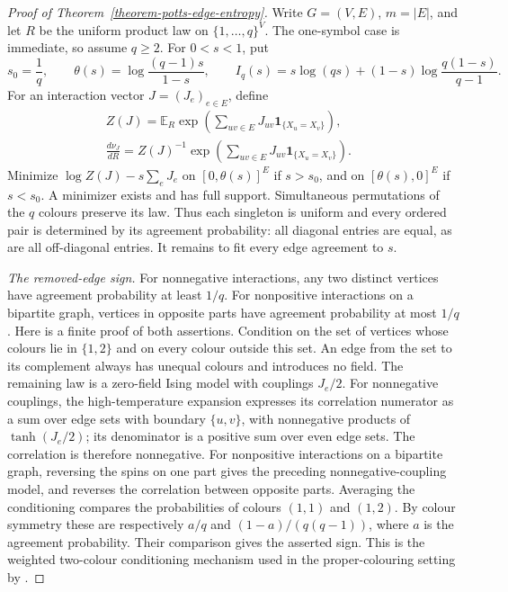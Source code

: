 \documentclass[a4paper,11pt,reqno]{amsart}
\theoremstyle{plain}
\theoremstyle{definition}
\theoremstyle{remark}
\begin{document}
\begin{proof}[Proof of Theorem~\ref{theorem-potts-edge-entropy}]
Write $G=(V,E)$, $m=|E|$, and let $R$ be the uniform product law on
$\{1,\ldots,q\}^{V}$.  The one-symbol case is immediate, so assume $q\ge2$.
For $0<s<1$, put
\[
 s_0=\frac1q,\qquad
 \theta(s)=\log\frac{(q-1)s}{1-s},\qquad
 I_q(s)=s\log(qs)+(1-s)\log\frac{q(1-s)}{q-1}.
\]
For an interaction vector $J=(J_e)_{e\in E}$, define
\begin{align*}
 Z(J)=\mathbb E_R\exp\!\left(\sum_{uv\in E}J_{uv}
                    \mathbf1_{\{X_u=X_v\}}\right),&\\
 \frac{d\nu_J}{dR}=Z(J)^{-1}
       \exp\!\left(\sum_{uv\in E}J_{uv}\mathbf1_{\{X_u=X_v\}}\right).&
\end{align*}
Minimize $\log Z(J)-s\sum_eJ_e$ on $[0,\theta(s)]^E$ if $s>s_0$,
and on $[\theta(s),0]^E$ if $s<s_0$.  A minimizer exists and has full
support.  Simultaneous permutations of the $q$ colours preserve its law.
Thus each singleton is uniform and every ordered pair is determined by its
agreement probability: all diagonal entries are equal, as are all
off-diagonal entries.  It remains to fit every edge agreement to $s$.

\smallskip\noindent\emph{The removed-edge sign.}
For nonnegative interactions, any two distinct vertices have agreement
probability at least $1/q$.  For nonpositive interactions on a bipartite
graph, vertices in opposite parts have agreement probability at most $1/q$.
Here is a finite proof of both assertions.  Condition on the set of vertices
whose colours lie in $\{1,2\}$ and on every colour outside this set.  An edge
from the set to its complement always has unequal colours and introduces no
field.  The remaining law is a zero-field Ising model with couplings $J_e/2$.
For nonnegative couplings, the high-temperature expansion expresses its
correlation numerator as a sum over edge sets with boundary $\{u,v\}$,
with nonnegative products of $\tanh(J_e/2)$; its denominator is a positive
sum over even edge sets.  The correlation is therefore nonnegative.
For nonpositive interactions on a bipartite graph, reversing the spins on
one part gives the preceding nonnegative-coupling model, and reverses the
correlation between opposite parts.  Averaging the conditioning compares
the probabilities of colours $(1,1)$ and $(1,2)$.  By colour symmetry these
are respectively $a/q$ and $(1-a)/(q(q-1))$, where $a$ is the agreement
probability.  Their comparison gives the asserted sign.  This is the
weighted two-colour conditioning mechanism used in the proper-colouring
setting by \citet{csikvarilin2017}.


\end{proof}
\end{document}
